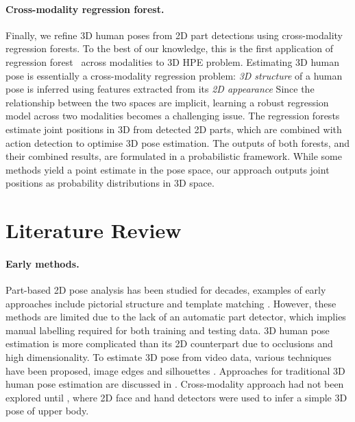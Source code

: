 \paragraph{Cross-modality regression forest.} 
Finally, we refine 3D human poses from 2D part detections using cross-modality regression forests.
To the best of our knowledge, this is the first application of regression forest~\cite{Criminisi2011} across modalities to 3D HPE problem.  
Estimating 3D human pose is essentially a cross-modality regression problem: 
\emph{3D structure} of a human pose is inferred using features extracted from its \emph{2D appearance} 
Since the relationship between the two spaces are implicit, learning a robust regression model across two modalities becomes a challenging issue. 
The regression forests estimate joint positions in 3D from detected 2D parts, which are combined with action detection to optimise 3D pose estimation. 
The outputs of both forests, and their combined results, are formulated in a probabilistic framework. 
While some methods yield a point estimate in the pose space, our approach outputs joint positions as probability distributions in 3D space. 


\section{Literature Review}
\label{sec/body/review}

\paragraph{Early methods.} 
Part-based 2D pose analysis has been studied for decades, examples of early approaches include \eg pictorial structure \cite{Fischler1973} and template matching \cite{Ioffe1999}. 
However, these methods are limited due to the lack of an automatic part detector, which implies manual labelling required for both training and testing data. 
3D human pose estimation is more complicated than its 2D counterpart due to occlusions and high dimensionality. 
To estimate 3D pose from video data, various techniques have been proposed, \eg image edges \cite{Hogg1983} and silhouettes \cite{Navaratnam2006}. Approaches for traditional 3D human pose estimation are discussed in \cite{Poppe2007}. 
Cross-modality approach had not been explored until \cite{Micilotta2006}, where 2D face and hand detectors were used to infer a simple 3D pose of upper body.  

